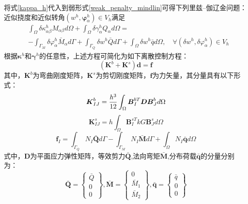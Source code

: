 将式\eqref{kappa_h}代入到弱形式\eqref{weak_penalty_mindlin}可得下列里兹--伽辽金问题：
近似挠度和近似转角$(w^h,\boldsymbol{\varphi}^h_{\alpha})\in V_h$满足
\begin{equation}\label{ritz_penalty_mindlin}
    \begin{split} 
        &\int_{\Omega}\delta\kappa^h_{\alpha\beta}M_{\alpha\beta}d\Omega+\int_{\Omega}\delta\gamma^h_{\alpha}Q_{\alpha}d\Omega=\\
        &-\int_{\Gamma_{M}}\delta\varphi^h_{\alpha}{\bar{M}_{\alpha}}d\Gamma+\int_{\Gamma_{Q}}{\delta{w^h}}\bar {Q}d\Gamma+\int_{\Omega} \delta{w^h}\bar{q}d\Omega,\quad \forall(\delta w^h,\delta\varphi^h_{\alpha}) \in V_h
    \end{split}
\end{equation}
根据$\boldsymbol\kappa^h$和$\boldsymbol\gamma^h$的任意性，上述方程可简化为如下离散控制方程：
\begin{equation}
    (\boldsymbol K^b + \boldsymbol K^s) \boldsymbol d = \boldsymbol f
\end{equation}
其中，$\boldsymbol K^b$为弯曲刚度矩阵，$\boldsymbol K^s$为剪切刚度矩阵，$\pmb{f}$为力矢量，其分量具有以下形式：
\begin{equation}\label{stiffness_bending}
    \boldsymbol K^b_{IJ} = \frac{h^3}{12} \int_\Omega \boldsymbol B^{bT}_I \boldsymbol D \boldsymbol B^b_J d\Omega\\
\end{equation}
\begin{equation}\label{stiffness_shear}
    \boldsymbol K^s_{IJ} = h \int_\Omega \boldsymbol B^{sT}_I kG \boldsymbol B^s_J d\Omega
\end{equation}
\begin{equation}
    \boldsymbol f_I = \int_{\Gamma_Q} N_I \bar{\boldsymbol Q} d\Gamma - \int_{\Gamma_M} N_I \bar{\boldsymbol M} d\Gamma + \int_\Omega N_I \bar{\boldsymbol q} d\Omega
\end{equation}
式中，$\boldsymbol{D}$为平面应力弹性矩阵，等效剪力$\bar{\boldsymbol Q}$,法向弯矩$\bar{\boldsymbol M}$,分布荷载$\bar{\boldsymbol q}$的分量分别为：
\begin{equation}
    \bar{\boldsymbol Q} =  
    \begin{Bmatrix}
        \bar Q \\ 0 \\ 0
    \end{Bmatrix},
        \bar{\boldsymbol M} =
    \begin{Bmatrix}
        0 \\ \bar M_1 \\ \bar M_2
    \end{Bmatrix},
        \bar{\boldsymbol q} =
    \begin{Bmatrix}
        \bar q \\ 0 \\ 0
    \end{Bmatrix}
\end{equation}

